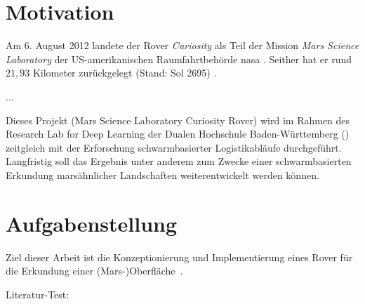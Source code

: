 



\section{Motivation}
\label{sec:motivation}

Am 6. August 2012 landete der Rover \textit{Curiosity} als Teil der Mission \textit{Mars Science Laboratory} der US-amerikanischen Raumfahrtbehörde \acf{nasa} \cite{vasavada2014}.
Seither hat er rund $21{,}93$ Kilometer zurückgelegt (Stand: Sol 2695) \cite{nasa2020}.

...

Dieses Projekt (Mars Science Laboratory Curiosity Rover) wird im Rahmen des Research Lab for Deep Learning der Dualen Hochschule Baden-Württemberg () zeitgleich mit der Erforschung schwarmbasierter Logistikabläufe durchgeführt.
Langfristig soll das Ergebnis unter anderem zum Zwecke einer schwarmbasierten Erkundung marsähnlicher Landschaften weiterentwickelt werden können.

\section{Aufgabenstellung}
\label{sec:aufgabe}

Ziel dieser Arbeit ist die \glqq Konzeptionierung und Implementierung eines Rover für die Erkundung einer (Mars-)Oberfläche\grqq\ \cite{mueller2019}.

Literatur-Test:
\cite{yamanoor2017}
\cite{horan2013}
\cite{molloy2016}
\cite{donat2018}
\cite{halfacree2019}
\cite{cole2013}
\cite{mcmanus2017}
\cite{cox2014}
\cite{pajankar2015}
